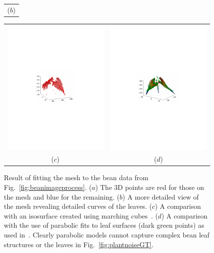 \begin{figure}
\begin{center}
\begin{tabular}{c}
($b$) \\
\end{tabular}
\begin{tabular}{cc}
\includegraphics[trim=190 280 190 290,clip,width=0.49\linewidth]{Figures/bean3DIsosurface} &
\includegraphics[trim=190 280 190 290,clip,width=0.49\linewidth]{Figures/beanParabolic} \\
($c$) & ($d$) \\
\end{tabular}
\end{center}
   \caption{ Result of fitting the mesh to the bean data from Fig.~\ref{fig:beanimageprocess}.  ($a$)  The $3$D points are red for those on the mesh and blue for the remaining.  ($b$) A more detailed view of the mesh revealing detailed curves of the leaves. ($c$) A comparison with an isosurface created using marching cubes~\cite{Curless:1996}. ($d$) A comparison with the use of parabolic fits to leaf surfaces (dark green points) as used in~\cite{Alenya2011,Alenya2013}.  Clearly parabolic models cannot capture complex bean leaf structures or the leaves in Fig.~\ref{fig:plantnoiseGT}. }
\label{fig:beanfit}
\end{figure}

